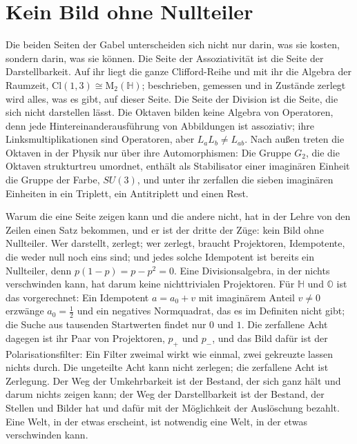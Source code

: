 \documentclass[11pt,a4paper]{article}
\newcommand{\HH}{\mathbb H}
\newcommand{\Oc}{\mathbb O}
\newcommand{\Cl}{\mathrm{Cl}}
\newcommand{\M}{\mathrm M}
\begin{document}
\section{Kein Bild ohne Nullteiler}
\label{sec:nullteiler}

Die beiden Seiten der Gabel unterscheiden sich nicht nur darin, was sie kosten, sondern darin, was sie können. Die Seite der Assoziativität ist die Seite der Darstellbarkeit. Auf ihr liegt die ganze Clifford-Reihe und mit ihr die Algebra der Raumzeit, $\Cl(1,3)\cong\M_2(\HH)$; beschrieben, gemessen und in Zustände zerlegt wird alles, was es gibt, auf dieser Seite. Die Seite der Division ist die Seite, die sich nicht darstellen lässt. Die Oktaven bilden keine Algebra von Operatoren, denn jede Hintereinanderausführung von Abbildungen ist assoziativ; ihre Linksmultiplikationen sind Operatoren, aber $L_aL_b\ne L_{ab}$. Nach außen treten die Oktaven in der Physik nur über ihre Automorphismen: Die Gruppe $G_2$, die die Oktaven strukturtreu umordnet, enthält als Stabilisator einer imaginären Einheit die Gruppe der Farbe, $SU(3)$, und unter ihr zerfallen die sieben imaginären Einheiten in ein Triplett, ein Antitriplett und einen Rest.

Warum die eine Seite zeigen kann und die andere nicht, hat in der Lehre von den Zeilen einen Satz bekommen, und er ist der dritte der Züge: kein Bild ohne Nullteiler. Wer darstellt, zerlegt; wer zerlegt, braucht Projektoren, Idempotente, die weder null noch eins sind; und jedes solche Idempotent ist bereits ein Nullteiler, denn $p(1-p)=p-p^2=0$. Eine Divisionsalgebra, in der nichts verschwinden kann, hat darum keine nichttrivialen Projektoren. Für $\HH$ und $\Oc$ ist das vorgerechnet: Ein Idempotent $a=a_0+v$ mit imaginärem Anteil $v\ne0$ erzwänge $a_0=\tfrac12$ und ein negatives Normquadrat, das es im Definiten nicht gibt; die Suche aus tausenden Startwerten findet nur $0$ und $1$. Die zerfallene Acht dagegen ist ihr Paar von Projektoren, $p_+$ und $p_-$, und das Bild dafür ist der Polarisationsfilter: Ein Filter zweimal wirkt wie einmal, zwei gekreuzte lassen nichts durch. Die ungeteilte Acht kann nicht zerlegen; die zerfallene Acht ist Zerlegung. Der Weg der Umkehrbarkeit ist der Bestand, der sich ganz hält und darum nichts zeigen kann; der Weg der Darstellbarkeit ist der Bestand, der Stellen und Bilder hat und dafür mit der Möglichkeit der Auslöschung bezahlt. Eine Welt, in der etwas erscheint, ist notwendig eine Welt, in der etwas verschwinden kann.
\end{document}
